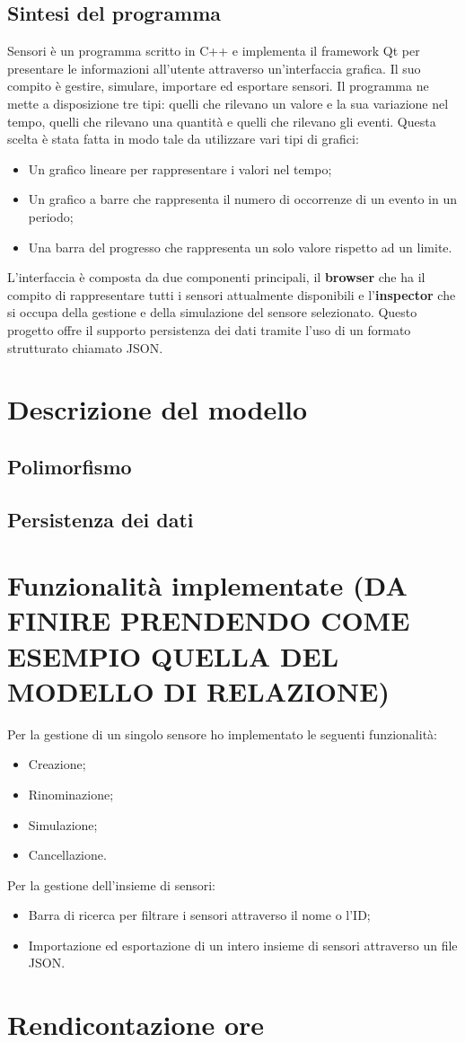 \documentclass[a4paper]{article}
\begin{document}
\subsection{Sintesi del programma}
Sensori è un programma scritto in C++ e implementa il framework Qt per presentare le informazioni all'utente attraverso un'interfaccia grafica. Il suo compito è gestire, simulare, importare ed esportare sensori.
Il programma ne mette a disposizione tre tipi: quelli che rilevano un valore e la sua variazione nel tempo, quelli che rilevano una quantità e quelli che rilevano gli eventi.
Questa scelta è stata fatta in modo tale da utilizzare vari tipi di grafici: 
\begin{itemize}
    \item Un grafico lineare per rappresentare i valori nel tempo;
    \item Un grafico a barre che rappresenta il numero di occorrenze di un evento in un periodo;
    \item Una barra del progresso che rappresenta un solo valore rispetto ad un limite.
\end{itemize}
L'interfaccia è composta da due componenti principali, il \textbf{browser} che ha il compito di rappresentare tutti i sensori attualmente disponibili e l'\textbf{inspector} che si occupa della gestione e della simulazione del sensore selezionato.
Questo progetto offre il supporto persistenza dei dati tramite l'uso di un formato strutturato chiamato JSON.
\section{Descrizione del modello}
\subsection{Polimorfismo}
\subsection{Persistenza dei dati}
\section{Funzionalità implementate (DA FINIRE PRENDENDO COME ESEMPIO QUELLA DEL MODELLO DI RELAZIONE)}
Per la gestione di un singolo sensore ho implementato le seguenti funzionalità:
\begin{itemize}
    \item Creazione;
    \item Rinominazione;
    \item Simulazione;
    \item Cancellazione.
\end{itemize}
Per la gestione dell'insieme di sensori:
\begin{itemize}
    \item Barra di ricerca per filtrare i sensori attraverso il nome o l'ID;
    \item Importazione ed esportazione di un intero insieme di sensori attraverso un file JSON.
\end{itemize}
\section{Rendicontazione ore}
\end{document}
